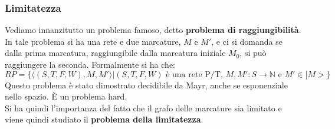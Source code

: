 \documentclass[a4paper,12pt, oneside]{book}
\begin{document}
\subsubsection{Limitatezza}
Vediamo innanzitutto un problema famoso, detto \textbf{problema di
  raggiungibilità}.\\
In tale problema si ha una rete e due marcature, $M$ e $M'$, e ci si domanda se
dalla prima marcatura, raggiungibile dalla marcatura iniziale $M_0$, si può
raggiungere la seconda. Formalmente si ha che:
\[RP= \{\langle(S, T , F , W ), M, M'\rangle | (S, T , F , W ) \mbox{ è una rete
    P/T},\,M,M':S\to \mathbb{N} \mbox{ e } M'\in[M>\}\]
Questo problema è stato dimostrato decidibile da Mayr, anche se esponenziale
nello spazio. È un problema hard.\\
Si ha quindi l'importanza del fatto che il grafo delle marcature sia limitato e
viene quindi studiato il \textbf{problema della limitatezza}.
\end{document}
